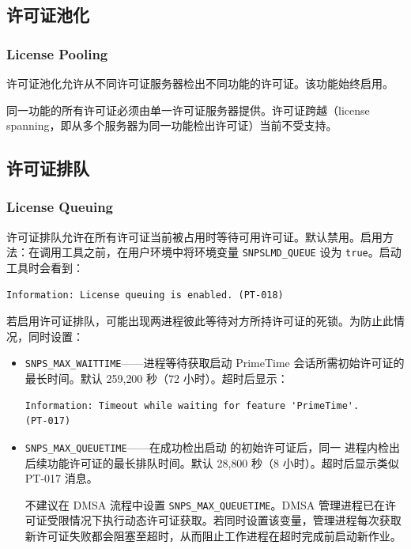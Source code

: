 \subsection{许可证池化}
\subsubsection*{License Pooling}

许可证池化允许从不同许可证服务器检出不同功能的许可证。该功能始终启用。

同一功能的所有许可证必须由单一许可证服务器提供。许可证跨越（license spanning，即从多个服务器为同一功能检出许可证）当前不受支持。

\subsection{许可证排队}
\subsubsection*{License Queuing}

许可证排队允许在所有许可证当前被占用时等待可用许可证。默认禁用。启用方法：在调用工具之前，在用户环境中将环境变量 \texttt{SNPSLMD\_QUEUE} 设为 \texttt{true}。启动工具时会看到：
\begin{lstlisting}
Information: License queuing is enabled. (PT-018)
\end{lstlisting}

若启用许可证排队，可能出现两进程彼此等待对方所持许可证的死锁。为防止此情况，同时设置：
\begin{itemize}
  \item \texttt{SNPS\_MAX\_WAITTIME}——进程等待获取启动 PrimeTime 会话所需初始许可证的最长时间。默认 259{,}200 秒（72 小时）。超时后显示：
\begin{lstlisting}
Information: Timeout while waiting for feature 'PrimeTime'.
(PT-017)
\end{lstlisting}
  \item \texttt{SNPS\_MAX\_QUEUETIME}——在成功检出启动  的初始许可证后，同一  进程内检出后续功能许可证的最长排队时间。默认 28{,}800 秒（8 小时）。超时后显示类似 PT-017 消息。
\begin{noteBox}
不建议在 DMSA 流程中设置 \texttt{SNPS\_MAX\_QUEUETIME}。DMSA 管理进程已在许可证受限情况下执行动态许可证获取。若同时设置该变量，管理进程每次获取新许可证失败都会阻塞至超时，从而阻止工作进程在超时完成前启动新作业。
\end{noteBox}
\end{itemize}

